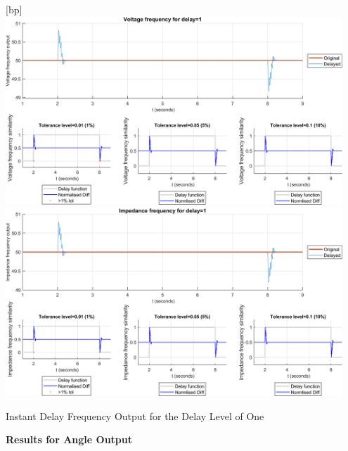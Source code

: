 \begin{floatingfigure}[p]{\textwidth}[bp]
    \includegraphics[width=0.95\textwidth]{PMUsim-figures/DelayOf_1/Instant_vFrequency.png}    
  \includegraphics[width=0.95\textwidth]{PMUsim-figures/DelayOf_1/Instant_iFrequency.png}    
    \label{fig:PMUsim_One_Frequency}
    \caption{Instant Delay Frequency Output for the Delay Level of One}
\end{floatingfigure}

\newpage \textbf{Results for Angle Output}


